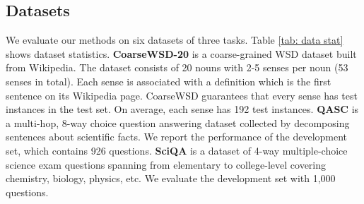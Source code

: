 \documentclass[11pt]{article}
\begin{document}
\subsection{Datasets}
\begin{table}[!t]
\centering
{}
\caption{Dataset statistics for the three tasks.}
\label{tab: data stat}
\end{table} We evaluate our methods on six datasets of three tasks. Table \ref{tab: data stat} shows dataset statistics.
\medbreak
\noindent\textbf{CoarseWSD-20} \cite{loureiro2021analysis} is a coarse-grained WSD dataset built from Wikipedia. The dataset consists of 20 nouns with 2-5 senses per noun (53 senses in total). Each sense is associated with a definition which is the first sentence on its Wikipedia page. CoarseWSD guarantees that every sense has test instances in the test set. On average, each sense has 192 test instances.
\medbreak
\noindent\textbf{QASC} \cite{khot2020qasc} is a multi-hop, 8-way choice question answering dataset collected by decomposing sentences about scientific facts. We report the performance of the development set, which contains 926 questions.
\medbreak
\noindent\textbf{SciQA} \cite{welbl-etal-2017-crowdsourcing} is a dataset of 4-way multiple-choice science exam questions spanning from elementary to college-level covering chemistry, biology, physics, etc. We evaluate the development set with 1,000 questions.
\end{document}
